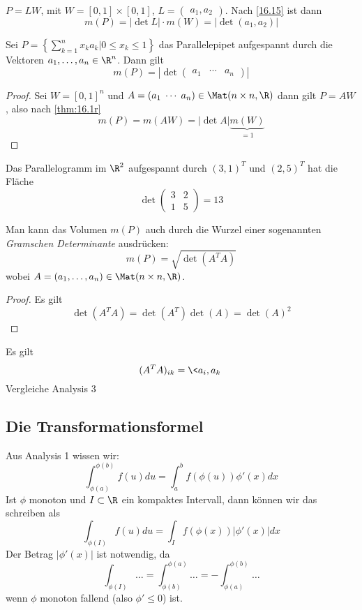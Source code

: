 \documentclass[a4paper,10pt]{scrartcl}
\begin{document}
\begin{ex*}
	$P = LW$, mit $W = [0,1] \times [0,1]$, $L = \begin{pmatrix}a_1, a_2\end{pmatrix}$.
	Nach \ref{16.15} ist dann
	\[
		m(P) = |\det L|\cdot m(W) = |\det (a_1,a_2)|
	\]
\end{ex*}

\begin{kor}
	\label{16.16}
	Sei $P = \left\{\sum_{k=1}^n x_k a_k \big| 0\le x_k \le 1\right\}$ das Parallelepipet aufgespannt durch die Vektoren $a_1,\dotsc, a_n\in \R^n$.
	Dann gilt
	\[
		m(P) = \left|\det \begin{pmatrix}a_1 & \cdots & a_n\end{pmatrix}\right|
	\]
	\begin{proof}
		Sei $W = [0,1]^n$ und $A=(a_1 \;\cdots\; a_n) \in \Mat(n\times n,\R)$ dann gilt $P=AW$, also nach \ref{thm:16.1r}
		\[
			m(P) = m(AW) = |\det A| \underbrace{m(W)}_{=1}
		\]
	\end{proof}
\end{kor}

\begin{ex*}
	Das Parallelogramm im $\R^2$ aufgespannt durch $(3,1)^T$ und $(2,5)^T$ hat die Fläche
	\[
		\det \begin{pmatrix}3&2\\1&5\end{pmatrix} = 13
	\]
\end{ex*}

\begin{note}
	Man kann das Volumen $m(P)$ auch durch die Wurzel einer sogenannten \emph{Gramschen Determinante} ausdrücken:
	\[
		m(P) = \sqrt{\det(A^TA)}
	\]
	wobei $A= (a_1, \dotsc, a_n)\in \Mat(n\times n,\R)$.
	\begin{proof}
		Es gilt
		\[
			\det(A^TA) = \det(A^T)\det(A) = \det(A)^2
		\]
	\end{proof}
	Es gilt
	\[
		(A^TA)_{ik} = \<a_i,a_k\>
	\]
	Vergleiche Analysis 3
\end{note}


\subsection{Die Transformationsformel}


Aus Analysis 1 wissen wir:
\[
	\int_{\phi(a)}^{\phi(b)}f(u) du = \int_a^b f(\phi(u))\phi'(x)dx
\]
Ist $\phi$ monoton und $I\subset \R$ ein kompaktes Intervall, dann können wir das schreiben als
\[
	\int_{\phi(I)}f(u)du = \int_If(\phi(x))|\phi'(x)|dx
\]
Der Betrag $|\phi'(x)|$ ist notwendig, da
\[
	\int_{\phi(I)}\dotso =  \int_{\phi(b)}^{\phi(a)} \dotso = - \int_{\phi(a)}^{\phi(b)}\dotso
\]
wenn $\phi$ monoton fallend (also $\phi' \le 0$) ist.
\end{document}
